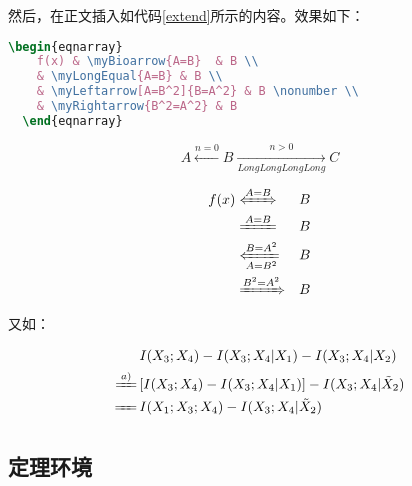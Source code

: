 然后，在正文插入如代码\ref{extend}所示的内容。效果如下：

\begin{lstlisting}[language={TeX}, caption={可伸长的符号}, label=extend]
  \begin{eqnarray}
    f(x) & \myBioarrow{A=B}  & B \\
    & \myLongEqual{A=B} & B \\
    & \myLeftarrow[A=B^2]{B=A^2} & B \nonumber \\
    & \myRightarrow{B^2=A^2} & B
  \end{eqnarray}
\end{lstlisting}

\begin{displaymath}
    A \xleftarrow{n=0} B \xrightarrow[LongLongLongLong]{n>0} C 
\end{displaymath}

\begin{eqnarray}
  f(x) & \myBioarrow{A=B}  & B \\
  & \myLongEqual{A=B} & B \\
  & \myLeftarrow[A=B^2]{B=A^2} & B \nonumber \\
  & \myRightarrow{B^2=A^2} & B
\end{eqnarray}

又如：

\begin{align}
  \label{eq:none}
  & I(X_3;X_4)-I(X_3;X_4|X_1)-I(X_3;X_4|X_2) \nonumber \\
  \myLongEqual{a)}\, & [I(X_3;X_4)-I(X_3;X_4|X_1)]-I(X_3;X_4|\tilde{X}_2) \\
  \myLongEqual[\rule{0.28cm}{0cm}]{}\, & I(X_1;X_3;X_4)-I(X_3;X_4|\tilde{X}_2)
\end{align}


\subsection{定理环境}


